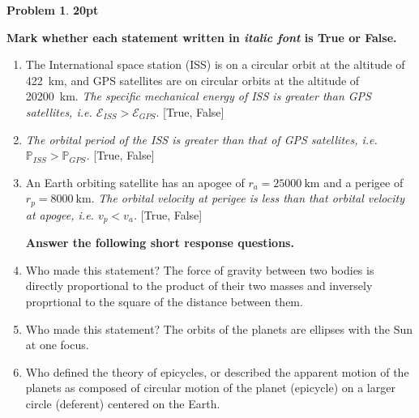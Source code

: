 \documentclass[10pt]{article}
\theoremstyle{definition}
\newtheorem{prob}{Problem}[section]
\renewcommand{\theprob}{\arabic{prob}}
\newenvironment{subprob}%
{\renewcommand{\theenumi}{\alph{enumi}}\renewcommand{\labelenumi}{(\theenumi)}\begin{enumerate}}%
{\end{enumerate}}%
\begin{document}
\clearpage\newpage
\begin{prob}
    \textbf{20pt} 
    
    \textbf{Mark whether each statement written in \textit{italic font} is True or False.}
\begin{subprob}

    \item The International space station (ISS) is on a circular orbit at the altitude of \SI{422}{\kilo\meter}, and GPS satellites are on circular orbits at the altitude of \SI{20200}{\kilo\meter}. \textit{The specific mechanical energy of ISS is greater than GPS satellites, i.e. $\mathcal{E}_{ISS} > \mathcal{E}_{GPS}$}. [True, False]

    \vspace*{1cm}

\item \textit{The orbital period of the ISS is greater than that of GPS satellites, i.e. $\mathbb{P}_{ISS} > \mathbb{P}_{GPS}$.} [True, False]

    \vspace*{1cm}
    
\item An Earth orbiting satellite has an apogee of \( r_a = \SI{25000}{\kilo\meter} \) and a perigee of \( r_p = \SI{8000}{\kilo\meter} \). 
    \textit{The orbital velocity at perigee is less than that orbital velocity at apogee, i.e. \( v_p < v_a \).} [True, False]

    \vspace*{1cm}
\textbf{Answer the following short response questions.}

    \item Who made this statement? The force of gravity between two bodies is directly proportional to the product of their two masses and inversely proprtional to the square of the distance between them.

    \vspace*{1cm}

    \item Who made this statement? The orbits of the planets are ellipses with the Sun at one focus.

    \vspace*{1cm}

    \item Who defined the theory of epicycles, or described the apparent motion of the planets as composed of circular motion of the planet (epicycle) on a larger circle (deferent) centered on the Earth.


\end{subprob}
\end{prob}
\end{document}
